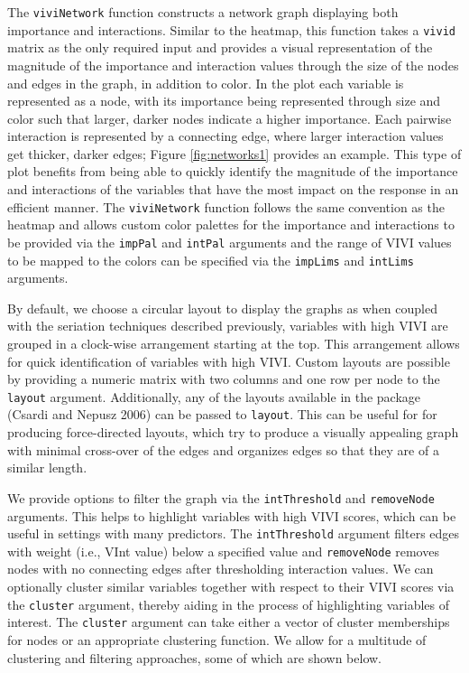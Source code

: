 The \texttt{viviNetwork} function constructs a network graph displaying both importance and interactions.
Similar to the heatmap, this function takes a \texttt{vivid} matrix as the only required input and provides a visual representation of the magnitude of the importance and interaction values through the size of the nodes and edges in the graph, in addition to color. In the plot each variable is represented as a node, with its importance being represented through size and color such that larger, darker nodes indicate a higher importance. Each pairwise interaction is represented by a connecting edge, where larger interaction values get thicker, darker edges; Figure \ref{fig:networks1} provides an example. This type of plot benefits from being able to quickly identify the magnitude of the importance and interactions of the variables that have the most impact on the response in an efficient manner. The \texttt{viviNetwork} function follows the same convention as the heatmap and allows custom color palettes for the importance and interactions to be provided via the \texttt{impPal} and \texttt{intPal} arguments and the range of VIVI values to be mapped to the colors can be specified via the \texttt{impLims} and \texttt{intLims} arguments.

By default, we choose a circular layout to display the graphs as when coupled with the seriation techniques described previously, variables with high VIVI are grouped in a clock-wise arrangement starting at the top. This arrangement allows for quick identification of variables with high VIVI. Custom layouts are possible by providing a numeric matrix with two columns and one row per node to the \texttt{layout} argument. Additionally, any of the layouts available in the  package (Csardi and Nepusz 2006) can be passed to \texttt{layout}. This can be useful for for producing force-directed layouts, which try to produce a visually appealing graph with minimal cross-over of the edges and organizes edges so that they are of a similar length.

We provide options to filter the graph via the \texttt{intThreshold} and \texttt{removeNode} arguments. This helps to highlight variables with high VIVI scores, which can be useful in settings with many predictors. The \texttt{intThreshold} argument filters edges with weight (i.e., VInt value) below a specified value and \texttt{removeNode} removes nodes with no connecting edges after thresholding interaction values. We can optionally cluster similar variables together with respect to their VIVI scores via the \texttt{cluster} argument, thereby aiding in the process of highlighting variables of interest. The \texttt{cluster} argument can take either a vector of cluster memberships for nodes or an appropriate  clustering function. We allow for a multitude of clustering and filtering approaches, some of which are shown below.

